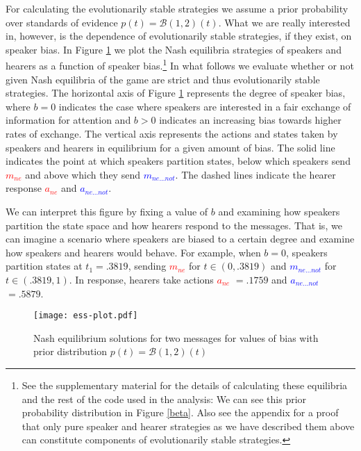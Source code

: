 \documentclass[linguex]{sp}
\theoremstyle{definition} \newtheorem{definition}{Definition}
\begin{document}
For calculating the evolutionarily stable strategies we assume a prior probability over standards of evidence $p(t) = \mathcal{B}(1,2)(t)$.  What we are really interested in, however, is the dependence of evolutionarily stable strategies, if they exist, on speaker bias. In Figure \ref{ess-plot} we plot the Nash equilibria strategies of speakers and hearers as a function of speaker bias.\footnote{See the supplementary material for the details of calculating these equilibria and the rest of the code used in the analysis:  We can see this prior probability distribution in Figure \ref{beta}. Also see the appendix for a proof that only pure speaker and hearer strategies as we have described them above can constitute components of evolutionarily stable strategies.}  In what follows we evaluate whether or not given Nash equilibria of the game are strict and thus evolutionarily stable strategies. The horizontal axis of Figure \ref{ess-plot} represents the degree of speaker bias, where $b=0$ indicates the case where speakers are interested in a fair exchange of information for attention and $b > 0$ indicates an increasing bias towards higher rates of exchange. The vertical axis represents the actions and states taken by speakers and hearers in equilibrium for a given amount of bias. The solid line indicates the point at which speakers partition states, below which speakers send \emph{\textcolor{red}{$m_{ne}$}} and above which they send \emph{\textcolor{blue}{$m_{ne...not}$}}. The dashed lines indicate the hearer response \emph{\textcolor{red}{$a_{ne}$}} and \emph{\textcolor{blue}{$a_{ne...not}$}}.  

We can interpret this figure by fixing a value of $b$ and examining how speakers partition the state space and how hearers respond to the messages.  That is, we can imagine a scenario where speakers are biased to a certain degree and examine how speakers and hearers would behave. For example, when $b=0$, speakers partition states at $t_1 = .3819$, sending \emph{\textcolor{red}{$m_{ne}$}} for $t \in (0, .3819)$ and \emph{\textcolor{blue}{$m_{ne...not}$}} for $t \in (.3819, 1)$. In response, hearers take actions \emph{\textcolor{red}{$a_{ne}$}} $=.1759$ and \emph{\textcolor{blue}{$a_{ne...not}$}} $ =.5879$. 

\begin{figure}
\begin{center}
	\texttt{[image: ess-plot.pdf]}
	\caption{Nash equilibrium solutions for two messages for values of bias with prior distribution $p(t) = \mathcal{B}(1,2)(t)$}
	\label{ess-plot}
\end{center}
\end{figure}
\end{document}
